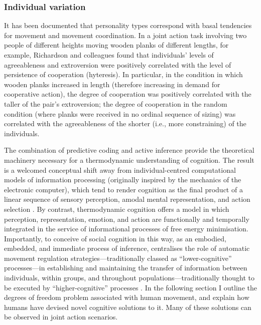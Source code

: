 \subsubsection{Individual variation}

It has been documented that personality types correspond with basal tendencies for movement and movement coordination. In a joint action task involving two people of different heights moving wooden planks of different lengths, for example, Richardson and colleagues \textcite{Richardson2007} found that individuals' levels of agreeableness and extroversion were positively correlated with the level of persistence of cooperation (hyteresis).  In particular, in the condition in which wooden planks increased in length (therefore increasing in demand for cooperative action), the degree of cooperation was positively correlated with the taller of the pair's extroversion; the degree of cooperation in the random condition (where planks were received in no ordinal sequence of sizing) was correlated with the agreeableness of the shorter (i.e., more constraining) of the individuals.

The combination of predictive coding and active inference provide the theoretical machinery necessary for a thermodynamic understanding of cognition.  The result is a welcomed conceptual shift away from individual-centred computational models of information processing (originally inspired by the mechanics of the electronic computer), which tend to render cognition as the final product of a linear sequence of sensory perception, amodal mental representation, and action selection \citep{Lewis2005}.  By contrast, thermodynamic cognition offers a model in which perception, representation, emotion, and action are functionally and temporally integrated in the service of informational processes of free energy minimisation.  Importantly,  to conceive of social cognition in this way, as an embodied, embedded, and immediate process of inference, centralises the role of automatic movement regulation strategies---traditionally classed as ``lower-cognitive'' processes---in establishing and maintaining the transfer of information between individuals, within groups, and throughout populations---traditionally thought to be executed by  ``higher-cognitive'' processes \citep{Claidiere2014}.
In the following section I outline the degrees of freedom problem associated with human movement, and explain how humans have devised novel cognitive solutions to it.  Many of these solutions can be observed in joint action scenarios.


